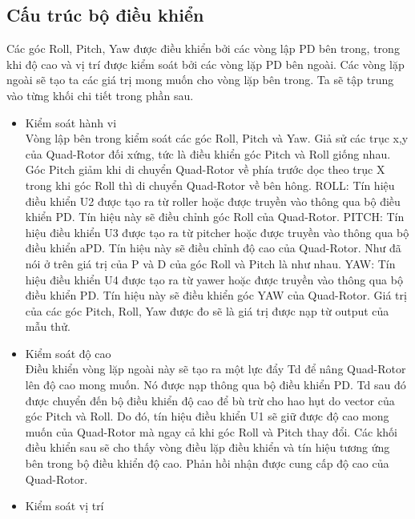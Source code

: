 			\subsection{Cấu trúc bộ điều khiển}
			Các góc Roll, Pitch, Yaw được điều khiển bởi các vòng lập PD bên trong, trong khi độ cao và vị trí được kiểm soát bởi các vòng lặp PD bên ngoài. Các vòng lặp ngoài sẽ tạo ta các giá trị mong muốn cho vòng lặp bên trong. Ta sẽ tập trung vào từng khối chi tiết trong phần sau.
\\
			\begin{itemize}
			\item Kiểm soát hành vi
			\\Vòng lập bên trong kiểm soát các góc Roll, Pitch và Yaw. Giả sử các trục x,y của Quad-Rotor đối xứng, tức là điều khiển góc Pitch và Roll giống nhau. Góc Pitch giảm khi di chuyển Quad-Rotor về phía trước dọc theo trục X trong khi góc Roll thì di chuyển Quad-Rotor về bên hông.
ROLL: Tín hiệu điều khiển U2 được tạo ra từ roller hoặc được truyền vào thông qua bộ điều khiển PD. Tín hiệu này sẽ điều chỉnh góc Roll của Quad-Rotor.
PITCH: Tín hiệu điều khiển U3 được tạo ra từ pitcher hoặc được truyền vào thông qua bộ điều khiển aPD. Tín hiệu này sẽ điều chỉnh độ cao của Quad-Rotor. Như đã nói ở trên giá trị của P và D của góc Roll và Pitch là như nhau.
YAW: Tín hiệu điều khiển U4 được tạo ra từ yawer hoặc được truyền vào thông qua bộ điều khiển PD. Tín hiệu này sẽ điều khiển góc YAW của Quad-Rotor. Giá trị của các góc Pitch, Roll, Yaw được đo sẽ là giá trị được nạp từ output của mẫu thử.
\\
			\item Kiểm soát độ cao
			\\
			Điều khiển vòng lặp ngoài này sẽ tạo ra một lực đẩy Td để nâng Quad-Rotor lên độ cao mong muốn. Nó được nạp thông qua bộ điều khiển PD. Td sau đó được chuyển đến bộ điều khiển độ cao để bù trừ cho hao hụt do vector của góc Pitch và Roll. Do đó, tín hiệu điều khiển U1 sẽ giữ được độ cao mong muốn của Quad-Rotor mà ngay cả khi góc Roll và Pitch thay đổi. Các khối điều khiển sau sẽ cho thấy vòng điều lặp điều khiển và tín hiệu tương ứng bên trong bộ điều khiển độ cao. Phản hồi nhận được cung cấp độ cao của Quad-Rotor.
\\
			\item Kiểm soát vị trí
			\\
			

\end{itemize}
